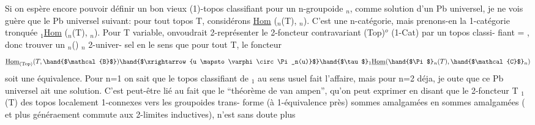 Si on espère encore pouvoir définir un bon vieux (1)-topos classifiant
pour un n-groupoide $_n$, comme solution d'un Pb universel, je ne vois
guère que le Pb universel suivant: pour tout topos T, considérons
\underline{Hom} (\hand{$\Pi$}$_n$(T), $_n$). C'est une n-catégorie, mais prenons-en la 1-catégorie
tronquée \hand{$\tau$}$_1$\underline{Hom} (\hand{$\Pi$}$_n$(T), $_n$). Pour T variable, on\hand{/}voudrait 2-représenter
le 2-foncteur contravariant (Top)$^{o}$ \hand{$\longrightarrow$} (1-Cat) par un topos classi-%
fiant  =  , donc trouver un \hand{$\Pi$}$_n$() \hand{$\xrightarrow{\varphi}$} $_n$ 2-univer-%
sel en le sens que pour tout T, le foncteur
\[ \underline{\mathrm{Hom}}_{(\mathrm{Top})}(T , \hand{$\mathcal{B}$} ) \hand{$\xrightarrow{u \mapsto \varphi \circ \Pi_n(u)}$} \hand{$\tau$}_1\underline{\mathrm{Hom}} (\hand{$\Pi$}_n(T), \hand{$\mathcal{C}$}_n) \]
soit une équivalence. Pour n=1 on sait que le topos classifiant de $_1$
au sens usuel fait l'affaire, mais pour n=2 déja, je oute que ce Pb
universel ait une solution. C'est peut-être lié au fait que le
``théorème de van ampen'', qu'on peut exprimer en disant que le 2-foncteur
T \hand{$\longrightarrow\Pi$}$_1$(T) des topos localement 1-connexes vers les groupoides trans-%
forme (à 1-équivalence près) sommes amalgamées en sommes amalgamées ( et
plus généraement commute aux 2-limites inductives), n'est sans doute plus

